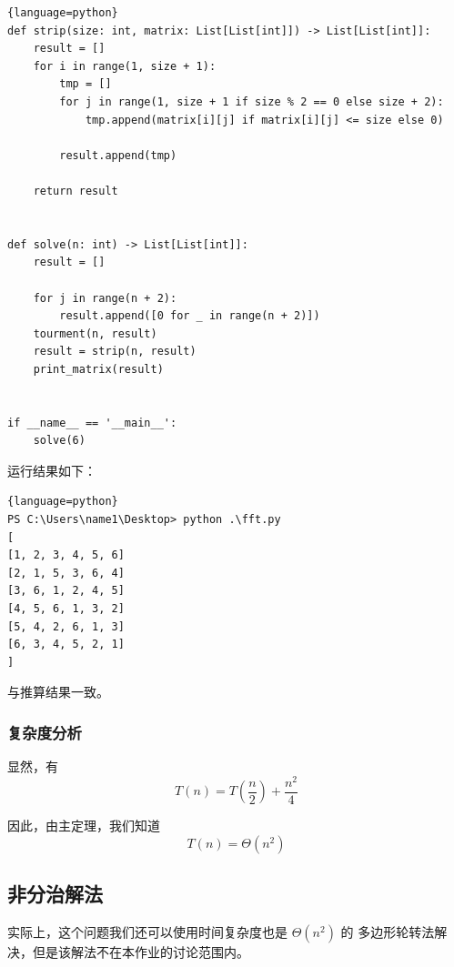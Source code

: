 \documentclass[ichigo,normal,cn]{elegantnote_mod}
\begin{document}
\begin{lstlisting}{language=python}
def strip(size: int, matrix: List[List[int]]) -> List[List[int]]:
    result = []
    for i in range(1, size + 1):
        tmp = []
        for j in range(1, size + 1 if size % 2 == 0 else size + 2):
            tmp.append(matrix[i][j] if matrix[i][j] <= size else 0)

        result.append(tmp)

    return result


def solve(n: int) -> List[List[int]]:
    result = []

    for j in range(n + 2):
        result.append([0 for _ in range(n + 2)])
    tourment(n, result)
    result = strip(n, result)
    print_matrix(result)


if __name__ == '__main__':
    solve(6)
\end{lstlisting}

运行结果如下：

\begin{lstlisting}{language=python}
PS C:\Users\name1\Desktop> python .\fft.py
[
[1, 2, 3, 4, 5, 6]
[2, 1, 5, 3, 6, 4]
[3, 6, 1, 2, 4, 5]
[4, 5, 6, 1, 3, 2]
[5, 4, 2, 6, 1, 3]
[6, 3, 4, 5, 2, 1]
]
\end{lstlisting}

与推算结果一致。

\subsubsection{复杂度分析}

显然，有
$$T(n) = T(\frac{n}{2}) + \frac{n^2}{4}$$

因此，由主定理，我们知道
$$T(n) = \Theta(n^2)$$

\subsection{非分治解法}

实际上，这个问题我们还可以使用时间复杂度也是 $\Theta(n^2)$ 的
多边形轮转法解决，但是该解法不在本作业的讨论范围内。
\end{document}
